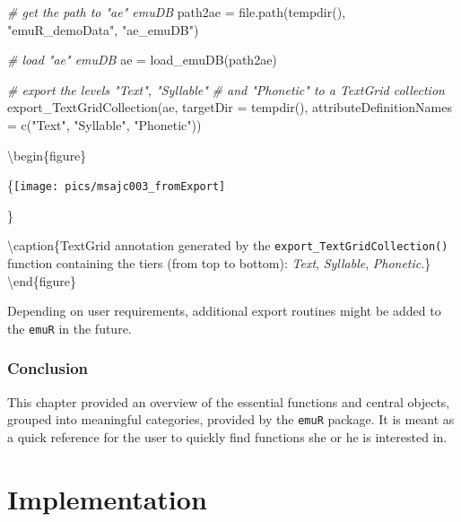 \documentclass[
]{book}
\newenvironment{Shaded}{\begin{snugshade}}{\end{snugshade}}
\newcommand{\AttributeTok}[1]{\textcolor[rgb]{0.77,0.63,0.00}{#1}}
\newcommand{\CommentTok}[1]{\textcolor[rgb]{0.56,0.35,0.01}{\textit{#1}}}
\newcommand{\FunctionTok}[1]{\textcolor[rgb]{0.00,0.00,0.00}{#1}}
\newcommand{\NormalTok}[1]{#1}
\newcommand{\OtherTok}[1]{\textcolor[rgb]{0.56,0.35,0.01}{#1}}
\newcommand{\StringTok}[1]{\textcolor[rgb]{0.31,0.60,0.02}{#1}}
\begin{document}
\begin{Shaded}
\begin{Highlighting}[]
\CommentTok{\# get the path to "ae" emuDB}
\NormalTok{path2ae }\OtherTok{=} \FunctionTok{file.path}\NormalTok{(}\FunctionTok{tempdir}\NormalTok{(), }\StringTok{"emuR\_demoData"}\NormalTok{, }\StringTok{"ae\_emuDB"}\NormalTok{)}

\CommentTok{\# load "ae" emuDB}
\NormalTok{ae }\OtherTok{=} \FunctionTok{load\_emuDB}\NormalTok{(path2ae)}

\CommentTok{\# export the levels "Text", "Syllable"}
\CommentTok{\# and "Phonetic" to a TextGrid collection}
\FunctionTok{export\_TextGridCollection}\NormalTok{(ae,}
                          \AttributeTok{targetDir =} \FunctionTok{tempdir}\NormalTok{(),}
                          \AttributeTok{attributeDefinitionNames =} \FunctionTok{c}\NormalTok{(}\StringTok{"Text"}\NormalTok{,}
                                                       \StringTok{"Syllable"}\NormalTok{,}
                                                       \StringTok{"Phonetic"}\NormalTok{))}
\end{Highlighting}
\end{Shaded}

\textbackslash begin\{figure\}

\{\centering \texttt{[image: pics/msajc003\_fromExport]}

\}

\textbackslash caption\{TextGrid annotation generated by the \texttt{export\_TextGridCollection()} function containing the tiers (from top to bottom): \emph{Text}, \emph{Syllable}, \emph{Phonetic}.\}\label{fig:emuRfuncs-msajc003-fromExport}
\textbackslash end\{figure\}

Depending on user requirements, additional export routines might be added to the \texttt{emuR} in the future.

\hypertarget{conclusion-6}{%
\section{Conclusion}\label{conclusion-6}}

This chapter provided an overview of the essential functions and central objects, grouped into meaningful categories, provided by the \texttt{emuR} package. It is meant as a quick reference for the user to quickly find functions she or he is interested in.

\hypertarget{part-implementation}{%
\part{Implementation}\label{part-implementation}}
\end{document}
